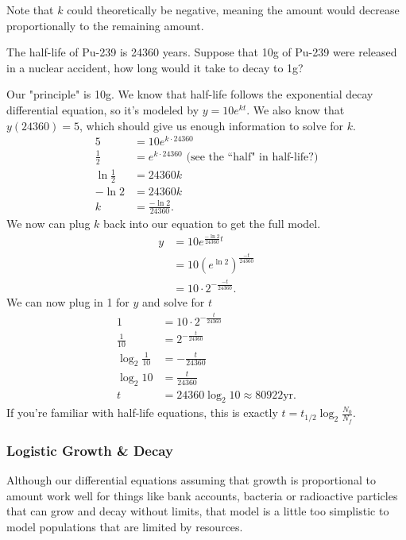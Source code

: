 \noindent
Note that $k$ could theoretically be negative, meaning the amount would decrease proportionally to the remaining amount.
\begin{example}
	The half-life of Pu-239 is 24360 years.
	Suppose that 10g of Pu-239 were released in a nuclear accident, how long would it take to decay to 1g?
\end{example}
Our "principle" is 10g.
We know that half-life follows the exponential decay differential equation, so it's modeled by $y = 10e^{kt}$.
We also know that $y(24360)=5$, which should give us enough information to solve for $k$.
\begin{align*}
	5 &= 10e^{k\cdot 24360} \\
	\frac{1}{2} &= e^{k\cdot 24360} \text{ (see the ``half" in half-life?)} \\
	\ln{\frac{1}{2}} &= 24360k \\
	-\ln{2} &= 24360k \\
	k &= \frac{-\ln{2}}{24360}. 
\end{align*}
\indent
We now can plug $k$ back into our equation to get the full model.
\begin{align*}
	y &= 10e^{\frac{-\ln{2}}{24360}t} \\
	&= 10\left(e^{\ln{2}}\right)^{\frac{-t}{24360}} \\
	&= 10\cdot2^{-\frac{-t}{24360}}.
\end{align*}
\indent
We can now plug in 1 for $y$ and solve for $t$
\begin{align*}
	1 &= 10\cdot2^{-\frac{t}{24360}} \\
	\frac{1}{10} &= 2^{-\frac{t}{24360}} \\
	\log_{2}{\frac{1}{10}} &= -\frac{t}{24360} \\
	\log_{2}{10} &= \frac{t}{24360} \\
	t &= 24360\log_{2}{10} \approx 80922\text{yr}.
\end{align*}
\indent
If you're familiar with half-life equations, this is exactly $t=t_{1/2}\log_{2}{\frac{N_0}{N_f}}$.

\subsubsection{Logistic Growth \& Decay}
Although our differential equations assuming that growth is proportional to amount work well for things like bank accounts, bacteria or radioactive particles that can grow and decay without limits, that model is a little too simplistic to model populations that are limited by resources.

